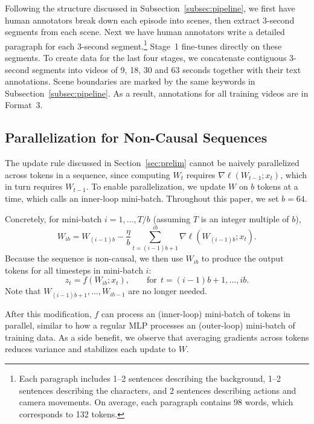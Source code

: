 Following the structure discussed in Subsection~\ref{subsec:pipeline}, we first have human annotators break down each episode into scenes, then extract 3-second segments from each scene.
Next we have human annotators write a detailed paragraph for each 3-second segment.\footnote{
Each paragraph includes 1–2 sentences describing the background, 1–2 sentences describing the characters, and 2 sentences describing actions and camera movements. 
On average, each paragraph contains 98 words, which corresponds to 132 tokens.
}
Stage~1 fine-tunes directly on these segments.
To create data for the last four stages, we concatenate contiguous 3-second segments into videos of 9, 18, 30 and 63 seconds together with their text annotations.
Scene boundaries are marked by the same keywords in Subsection~\ref{subsec:pipeline}. As a result, annotations for all training videos are in Format~3.

\subsection{Parallelization for Non-Causal Sequences}
\label{subsec:parallel}
The update rule discussed in Section~\ref{sec:prelim} cannot be naively parallelized across tokens in a sequence, since computing $W_t$ requires $\nabla\ell(W_{t-1}; x_t)$, which in turn requires $W_{t-1}$.
To enable parallelization, we update $W$ on $b$ tokens at a time, which \cite{sun2024ttt} calls an inner-loop mini-batch.
Throughout this paper, we set $b=64$.

Concretely,  
for mini-batch $i = 1,\dots,T/b$ (assuming $T$ is an integer multiple of $b$), 
\begin{equation}
W_{ib} = W_{(i-1)b} - \frac{\eta}{b}\sum_{t=(i-1)b+1}^{ib}\nabla \ell\left(W_{(i-1)b}; x_t\right).
\label{eq:ttt_update_new}
\end{equation}
Because the sequence is non-causal, we then use $W_{ib}$ to produce the output tokens for all timesteps in mini-batch $i$:
\begin{equation}
    z_t = f(W_{ib}; x_t), \quad \quad \text{for}~~t = (i-1)b+1,\dots, ib.
    \label{eq:ttt_output_new}
\end{equation}
Note that $W_{(i-1)b+1},\dots,W_{ib-1}$ are no longer needed.

After this modification, $f$ can process an (inner-loop) mini-batch of tokens in parallel, similar to how a regular MLP processes an (outer-loop) mini-batch of training data. 
As a side benefit, we observe that averaging gradients across tokens reduces variance and stabilizes each update to $W$.

